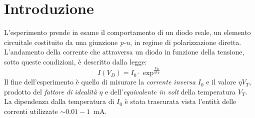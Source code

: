 \documentclass[@SRC@/main]{subfiles}
\begin{document}
    \section{Introduzione} \label{sec:introduzione}
    L'esperimento prende in esame il comportamento di un diodo reale, un elemento circuitale
    costituito da una giunzione \textit{p-n}, in regime di polarizzazione diretta.
    L'andamento della corrente che attraversa un diodo in funzione della tensione,
    sotto queste condizioni, è descritto dalla legge:
    \begin{equation}
        \label{eq:caratteristiche}
        I(V_D) = I_0\cdot \exp^{\frac{V_D}{\eta V_T}}
    \end{equation}
    Il fine dell'esperimento è quello di misurare la \textit{corrente inversa} $I_0$ e il
    valore $\eta V_T$, prodotto del \textit{fattore di idealità} $\eta$ e
    dell'\textit{equivalente in volt} della temperatura $V_T$.
    La dipendenza dalla temperatura di $I_0$ è stata trascurata vista l'entità
    delle correnti utilizzate $\sim 0.01-1$~mA.
\end{document}
